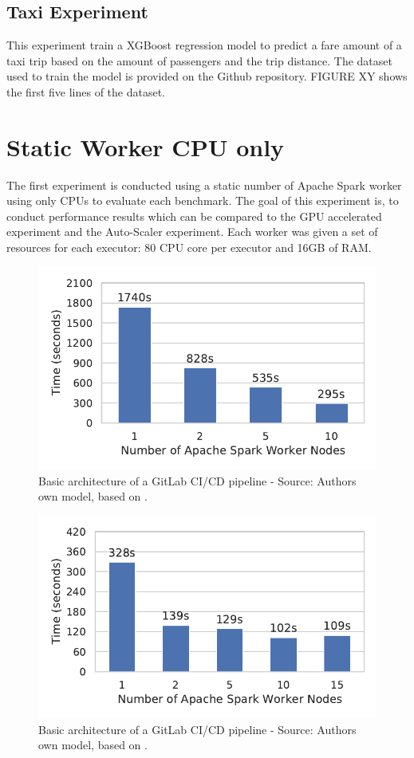 \subsection{Taxi Experiment}
This experiment train a XGBoost regression model to predict a fare amount of a taxi trip based on the amount of passengers and the trip distance.
The dataset used to train the model is provided on the Github repository. FIGURE XY shows the first five lines of the dataset.


\section{Static Worker CPU only}
The first experiment is conducted using a static number of Apache Spark worker using only CPUs to evaluate each benchmark.
The goal of this experiment is, to conduct performance results which can be compared to the GPU accelerated experiment and the Auto-Scaler experiment.
Each worker was given a set of resources for each executor: 80 CPU core per executor and 16GB of RAM.
\begin{figure}[h]
\centering
\includegraphics[scale=1]{images/07_evaluation/mortgage/mortgage_cpu_spark-job-mean-time}
\caption{Basic architecture of a GitLab CI/CD pipeline - Source: Authors own model, based on \cite{Gitlab2020Docs}.}
\label{fig:07_mortgage_static-cpu_results}
\end{figure}
\begin{figure}[h]
\centering
\includegraphics[scale=1]{images/07_evaluation/taxi/taxi_cpu_spark-job-mean-time}
\caption{Basic architecture of a GitLab CI/CD pipeline - Source: Authors own model, based on \cite{Gitlab2020Docs}.}
\label{fig:07_taxi_static-cpu_results}
\end{figure}
